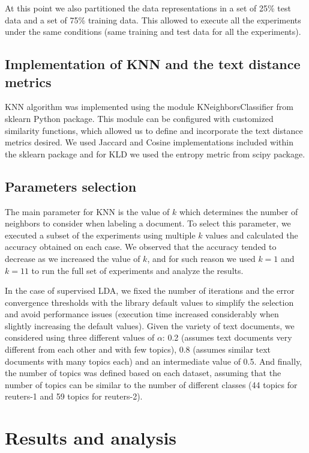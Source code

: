 \documentclass[preprint,12pt,3p]{elsarticle}
\begin{document}
At this point we also partitioned the data representations in a set of 25\% test data and a set of 75\% training data. This allowed to execute all the experiments under the same conditions (same training and test data for all the experiments).

\subsection{Implementation of KNN and the text distance metrics}

KNN algorithm was implemented using the module KNeighborsClassifier from sklearn Python package. This module can be configured with customized similarity functions, which allowed us to define and incorporate the text distance metrics desired. We used Jaccard and Cosine implementations included within the sklearn package and for KLD we used the entropy metric from scipy package.

\subsection{Parameters selection}

The main parameter for KNN is the value of $k$ which determines the number of neighbors to consider when labeling a document. To select this parameter, we executed a subset of the experiments using multiple $k$ values and calculated the accuracy obtained on each case. We observed that the accuracy tended to decrease as we increased the value of $k$, and for such reason we used ${k=1}$ and ${k=11}$ to run the full set of experiments and analyze the results.\par

In the case of supervised LDA, we fixed the number of iterations and the error convergence thresholds with the library default values to simplify the selection and avoid performance issues (execution time increased considerably when slightly increasing the default values). Given the variety of text documents, we considered using three different values of $\alpha$: 0.2 (assumes text documents very different from each other and with few topics), 0.8 (assumes similar text documents with many topics each) and an intermediate value of 0.5. And finally, the number of topics was defined based on each dataset, assuming that the number of topics can be similar to the number of different classes (44 topics for reuters-1 and 59 topics for reuters-2).


\section{Results and analysis}
\label{results_and_analysis}
\end{document}
